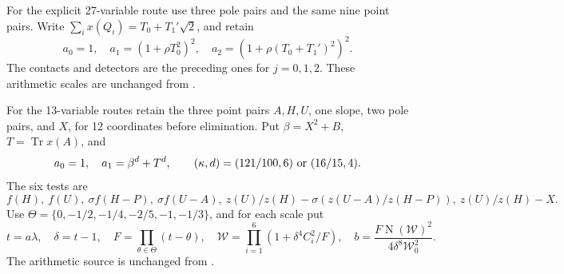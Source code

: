 \documentclass[11pt,a4paper]{article}
\theoremstyle{remark}\newtheorem{remark}[theorem]{Remark}
\DeclareMathOperator{\Tr}{Tr}\DeclareMathOperator{\N}{N}\DeclareMathOperator{\Disc}{Disc}
\begin{document}
For the explicit 27-variable route use three pole pairs and the same
nine point pairs. Write $\sum_i x(Q_i)=T_0+T_1'\sqrt2$, and retain
\[
 a_0=1,\quad a_1=(1+\rho T_0^2)^2,\quad
 a_2=(1+\rho(T_0+T_1')^2)^2.
\]
The contacts and detectors are the preceding ones for $j=0,1,2$.
These arithmetic scales are unchanged from \cite{Explicit}.

For the 13-variable routes retain the three point pairs $A,H,U$, one
slope, two pole pairs, and $X$, for 12 coordinates before elimination.
Put $\beta=X^2+B$, $T=\Tr x(A)$, and
\[
 a_0=1,\quad a_1=\beta^d+T^d,\qquad
 (\kappa,d)=(121/100,6)\ \hbox{or}\ (16/15,4).
\]
The six tests are
\[
 f(H),\ f(U),\ \sigma f(H-P),\ \sigma f(U-A),\
 z(U)/z(H)-\sigma(z(U-A)/z(H-P)),\ z(U)/z(H)-X.
\]
Use $\Theta=\{0,-1/2,-1/4,-2/5,-1,-1/3\}$, and for each scale put
\begin{equation}\label{eq:conditional}
 t=a\lambda,\quad \delta=t-1,\quad F=\prod_{\theta\in\Theta}(t-\theta),
 \quad \mathcal W=\prod_{i=1}^6(1+\delta^4C_i^2/F),\quad
 b=\frac{F\N(\mathcal W)^2}{4\delta^8\mathcal W_0^2}.
\end{equation}
The arithmetic source is unchanged from \cite{Conditional}.
\end{document}
